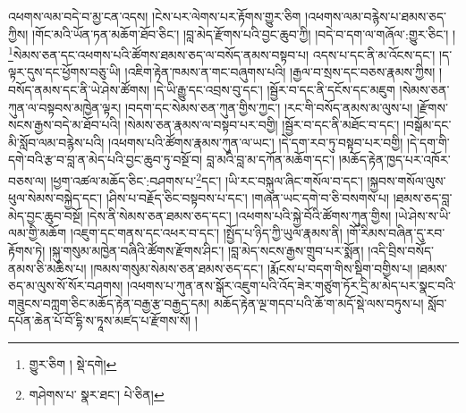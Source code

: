 འཕགས་ལམ་བདེ་བ་མྱ་ངན་འདས། །ངེས་པར་ལེགས་པར་རྟོགས་གྱུར་ཅིག །འཕགས་ལམ་བརྙེས་པ་ཐམས་ཅད་ཀྱིས། །གོང་མའི་ཡོན་ཏན་མཆོག་ཐོབ་ཅིང་། །བླ་མེད་རྫོགས་པའི་བྱང་ཆུབ་ཀྱི། །བདེ་བ་དག་ལ་གཞོལ་:གྱུར་ཅིང་། །\footnote{གྱུར་ཅིག །  སྡེ་དགེ། }སེམས་ཅན་དང་འཕགས་པའི་ཚོགས་ཐམས་ཅད་ལ་བསོད་ནམས་བསྟབ་པ། འདས་པ་དང་ནི་མ་འོངས་དང་། །ད་ལྟར་དུས་དང་ཕྱོགས་བཅུ་ཡི། །འཇིག་རྟེན་ཁམས་ན་གང་བཞུགས་པའི། །རྒྱལ་བ་སྲས་དང་བཅས་རྣམས་ཀྱིས། །བསོད་ནམས་དང་ནི་ཡེ་ཤེས་ཚོགས། །དེ་ཡི་རྒྱུ་དང་འབྲས་བུ་དང་། །སྦྱོར་བ་དང་ནི་དངོས་དང་མཇུག །སེམས་ཅན་ཀུན་ལ་བསྟབས་མཁྱེན་ལྟར། །བདག་དང་སེམས་ཅན་ཀུན་གྱིས་ཀྱང་། །རང་གི་བསོད་ནམས་མ་ལུས་པ། །རྫོགས་སངས་རྒྱས་བདེ་མ་ཐོབ་པའི། །སེམས་ཅན་རྣམས་ལ་བསྟབ་པར་བགྱི། །སྦྱོར་བ་དང་ནི་མཐོང་བ་དང་། །བསྒོམ་དང་མི་སློབ་ལམ་བརྙེས་པའི། །འཕགས་པའི་ཚོགས་རྣམས་ཀུན་ལ་ཡང་། །དེ་དག་རབ་ཏུ་བསྟབ་པར་བགྱི། །དེ་དག་གི་དགེ་བའི་རྩ་བ་བླ་ན་མེད་པའི་བྱང་ཆུབ་ཏུ་བསྔོ་བ། བླ་མའི་བླ་མ་དཀོན་མཆོག་དང་། །མཆོད་རྟེན་ཁྱད་པར་འཁོར་བཅས་ལ། །ཕྱག་འཚལ་མཆོད་ཅིང་:བཤགས་པ་\footnote{གཤེགས་པ་  སྣར་ཐང་།  པེ་ཅིན། }དང་། །ཡི་རང་བསྐུལ་ཞིང་གསོལ་བ་དང་། །སྐྱབས་གསོལ་ལུས་ཕུལ་སེམས་བསྐྱེད་དང་། །ཤིས་པ་བརྗོད་ཅིང་བསྟབས་པ་དང་། །གཞན་ཡང་དགེ་བ་ཅི་བསགས་པ། །ཐམས་ཅད་བླ་མེད་བྱང་ཆུབ་བསྔོ། །དེས་ནི་སེམས་ཅན་ཐམས་ཅད་དང་། །འཕགས་པའི་སྐྱེ་བོའི་ཚོགས་ཀུན་གྱིས། །ཡེ་ཤེས་ས་ཡི་ལམ་གྱི་མཆོག །འཇུག་དང་གནས་དང་འཕར་བ་དང་། །སྤྱོད་པ་ཉིད་ཀྱི་ཡུལ་རྣམས་ནི། །གོ་རིམས་བཞིན་དུ་རབ་རྟོགས་ཏེ། །སྐུ་གསུམ་མཁྱེན་བཞིའི་ཚོགས་རྫོགས་ཤིང་། །བླ་མེད་སངས་རྒྱས་གྲུབ་པར་སྨོན། །འདི་བྲིས་བསོད་ནམས་ཅི་མཆིས་པ། །ཁམས་གསུམ་སེམས་ཅན་ཐམས་ཅད་དང་། །རྨོངས་པ་བདག་གིས་སྡིག་བགྱིས་པ། །ཐམས་ཅད་མ་ལུས་སོ་སོར་བཤགས། །འཕགས་པ་ཀུན་ནས་སྒོར་འཇུག་པའི་འོད་ཟེར་གཙུག་ཏོར་དྲི་མ་མེད་པར་སྣང་བའི་གཟུངས་བཀླག་ཅིང་མཆོད་རྟེན་བརྒྱ་རྩ་བརྒྱད་དམ། མཆོད་རྟེན་ལྔ་གདབ་པའི་ཆོ་ག་མདོ་སྡེ་ལས་བཏུས་པ། སློབ་དཔོན་ཆེན་པོ་བོ་དྷི་ས་ཏཱས་མཛད་པ་རྫོགས་སོ། ། 